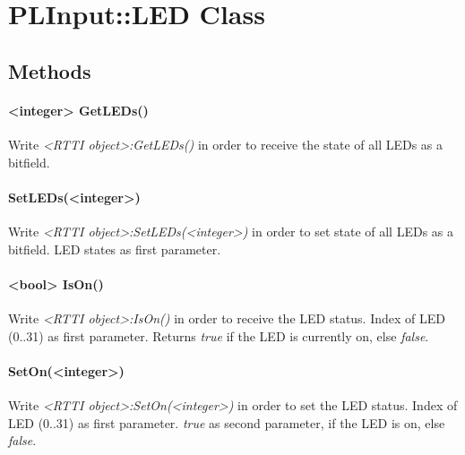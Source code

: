 \section{PLInput::LED Class}


\subsection{Methods}

\paragraph{<integer> GetLEDs()}
Write \emph{<RTTI object>:GetLEDs()} in order to receive the state of all LEDs as a bitfield.

\paragraph{SetLEDs(<integer>)}
Write \emph{<RTTI object>:SetLEDs(<integer>)} in order to set state of all LEDs as a bitfield. LED states as first parameter.

\paragraph{<bool> IsOn()}
Write \emph{<RTTI object>:IsOn()} in order to receive the LED status. Index of LED (0..31) as first parameter. Returns \emph{true} if the LED is currently on, else \emph{false}.

\paragraph{SetOn(<integer>)}
Write \emph{<RTTI object>:SetOn(<integer>)} in order to set the LED status. Index of LED (0..31) as first parameter. \emph{true} as second parameter, if the LED is on, else \emph{false}.
